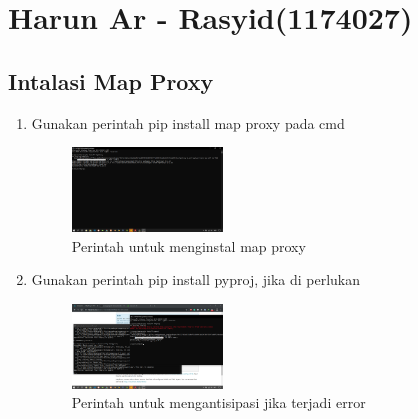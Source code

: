 \section{Harun Ar - Rasyid(1174027)}
\subsection{Intalasi Map Proxy}
\begin{enumerate}
    \item Gunakan perintah pip install map proxy pada cmd
    \hfill\break
    \begin{figure}[H]
		\includegraphics[width=4cm]{figures/1174027/5/1.png}
		\centering
		\caption{Perintah untuk menginstal map proxy}
    \end{figure}
    \item Gunakan perintah pip install pyproj, jika di perlukan
    \hfill\break
    \begin{figure}[H]
		\includegraphics[width=4cm]{figures/1174027/5/2.png}
		\centering
		\caption{Perintah untuk mengantisipasi jika terjadi error}
    \end{figure}
\end{enumerate}
